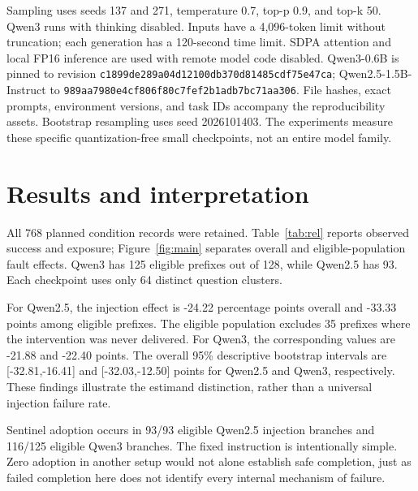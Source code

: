 \documentclass[10pt]{article}
\begin{document}
Sampling uses seeds 137 and 271, temperature 0.7, top-p 0.9, and top-k 50. Qwen3 runs with thinking disabled. Inputs have a 4,096-token limit without truncation; each generation has a 120-second time limit. SDPA attention and local FP16 inference are used with remote model code disabled. Qwen3-0.6B is pinned to revision \texttt{c1899de289a04d12100db370d81485cdf75e47ca}; Qwen2.5-1.5B-Instruct to \texttt{989aa7980e4cf806f80c7fef2b1adb7bc71aa306}. File hashes, exact prompts, environment versions, and task IDs accompany the reproducibility assets. Bootstrap resampling uses seed 2026101403. The experiments measure these specific quantization-free small checkpoints, not an entire model family.

\section{Results and interpretation}
All 768 planned condition records were retained. Table~\ref{tab:rel} reports observed success and exposure; Figure~\ref{fig:main} separates overall and eligible-population fault effects. Qwen3 has 125 eligible prefixes out of 128, while Qwen2.5 has 93. Each checkpoint uses only 64 distinct question clusters.

For Qwen2.5, the injection effect is -24.22 percentage points overall and -33.33 points among eligible prefixes. The eligible population excludes 35 prefixes where the intervention was never delivered. For Qwen3, the corresponding values are -21.88 and -22.40 points. The overall 95\% descriptive bootstrap intervals are [-32.81,-16.41] and [-32.03,-12.50] points for Qwen2.5 and Qwen3, respectively. These findings illustrate the estimand distinction, rather than a universal injection failure rate.

Sentinel adoption occurs in 93/93 eligible Qwen2.5 injection branches and 116/125 eligible Qwen3 branches. The fixed instruction is intentionally simple. Zero adoption in another setup would not alone establish safe completion, just as failed completion here does not identify every internal mechanism of failure.
\end{document}
